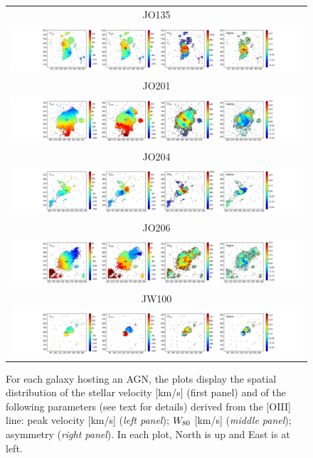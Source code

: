 \documentclass[fleqn,usenatbib]{mnras}
\begin{document}
\begin{figure}
	\begin{tabular}{c}
		JO135 \\
		\includegraphics[width=.9\linewidth]{Plots/JO135_npars_grid.png}\\
		JO201 \\
		\includegraphics[width=.9\linewidth]{Plots/JO201_npars_grid.png} \\
		JO204\\
		\includegraphics[width=.9\linewidth]{Plots/JO204_npars_grid.png}\\
		JO206\\
		\includegraphics[width=.9\linewidth]{Plots/JO206_npars_grid.png}\\
		JW100\\
		\includegraphics[width=.9\linewidth]{Plots/JW100_npars_grid.png}\\
	\end{tabular} 
	\caption{For each galaxy hosting an AGN, the plots display the spatial distribution  of the stellar velocity [km/s] (first panel) and of the following parameters (see text for details) derived from the [OIII] line: peak velocity [km/s] ({\em left panel});
	$W_{\rm 80}$ [km/s] ({\em middle panel}); asymmetry ({\em right panel}). In each plot, North is up and East is at left.\label{fig:npars}}
\end{figure}
\end{document}
